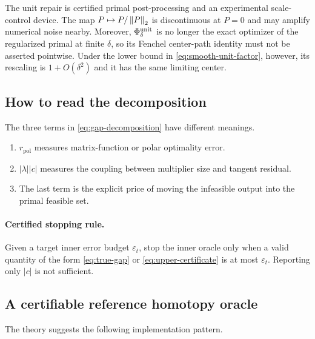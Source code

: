 \begin{boundary}
The unit repair is certified primal post-processing and an experimental
scale-control device.  The map \(P\mapsto P/\left\lVert P\right\rVert_{2}\) is discontinuous at
\(P=0\) and may amplify numerical noise nearby.  Moreover,
\(\Phi_\delta^{\rm unit}\) is no longer the exact optimizer of the
regularized primal at finite \(\delta\), so its Fenchel center-path identity
must not be asserted pointwise.  Under the lower bound in
\eqref{eq:smooth-unit-factor}, however, its rescaling is \(1+O(\delta^2)\)
and it has the same limiting center.
\end{boundary}

\subsection{How to read the decomposition}

The three terms in \eqref{eq:gap-decomposition} have different meanings.

\begin{enumerate}
  \item \(r_{\mathrm{pol}}\) measures matrix-function or polar optimality
        error.
  \item \(|\lambda||c|\) measures the coupling between multiplier size and
        tangent residual.
  \item The last term is the explicit price of moving the infeasible output
        into the primal feasible set.
\end{enumerate}

\paragraph{Certified stopping rule.}
Given a target inner error budget \(\varepsilon_t\), stop the inner oracle only
when a valid quantity of the form \eqref{eq:true-gap} or
\eqref{eq:upper-certificate} is at most \(\varepsilon_t\).  Reporting only
\(|c|\) is not sufficient.

\subsection{A certifiable reference homotopy oracle}

The theory suggests the following implementation pattern.


